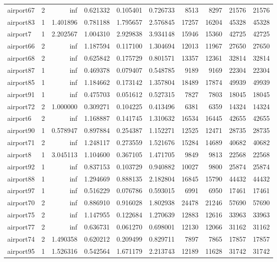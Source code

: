 \begin{longtable}{|l|r|r|r|r|r|r|r|r|r|}
airport67 & 2 & inf & 0.621332 & 0.105401 & 0.726733 & 8513 & 8297 & 21576 & 21576 \\
airport83 & 1 & 1.401896 & 0.781188 & 1.795657 & 2.576845 & 17257 & 16204 & 45328 & 45328 \\
airport7 & 1 & 2.202567 & 1.004310 & 2.929838 & 3.934148 & 15946 & 15360 & 42725 & 42725 \\
airport66 & 2 & inf & 1.187594 & 0.117100 & 1.304694 & 12013 & 11967 & 27650 & 27650 \\
airport68 & 2 & inf & 0.625842 & 0.175729 & 0.801571 & 13357 & 12361 & 32814 & 32814 \\
airport87 & 1 & inf & 0.469378 & 0.079407 & 0.548785 & 9189 & 9169 & 22304 & 22304 \\
airport85 & 1 & inf & 1.184662 & 0.173142 & 1.357804 & 18489 & 17874 & 49939 & 49939 \\
airport91 & 1 & inf & 0.475703 & 0.051612 & 0.527315 & 7827 & 7803 & 18045 & 18045 \\
airport72 & 2 & 1.000000 & 0.309271 & 0.104225 & 0.413496 & 6381 & 6359 & 14324 & 14324 \\
airport6 & 2 & inf & 1.168887 & 0.141745 & 1.310632 & 16534 & 16445 & 42655 & 42655 \\
airport90 & 1 & 0.578947 & 0.897884 & 0.254387 & 1.152271 & 12525 & 12471 & 28735 & 28735 \\
airport71 & 2 & inf & 1.248117 & 0.273559 & 1.521676 & 15284 & 14689 & 40682 & 40682 \\
airport8 & 1 & 3.045113 & 1.104600 & 0.367105 & 1.471705 & 9849 & 9813 & 22568 & 22568 \\
airport92 & 1 & inf & 0.837153 & 0.103729 & 0.940882 & 10027 & 9800 & 25874 & 25874 \\
airport88 & 1 & inf & 1.294669 & 0.888135 & 2.182804 & 16845 & 15790 & 44432 & 44432 \\
airport97 & 1 & inf & 0.516229 & 0.076786 & 0.593015 & 6991 & 6950 & 17461 & 17461 \\
airport70 & 2 & inf & 0.886910 & 0.916028 & 1.802938 & 24478 & 21246 & 57690 & 57690 \\
airport75 & 2 & inf & 1.147955 & 0.122684 & 1.270639 & 12883 & 12616 & 33963 & 33963 \\
airport77 & 2 & inf & 0.636731 & 0.061270 & 0.698001 & 12130 & 12066 & 31162 & 31162 \\
airport74 & 2 & 1.490358 & 0.620212 & 0.209499 & 0.829711 & 7897 & 7865 & 17857 & 17857 \\
airport95 & 1 & 1.526316 & 0.542564 & 1.671179 & 2.213743 & 12189 & 11628 & 31742 & 31742 \\

\end{longtable}
